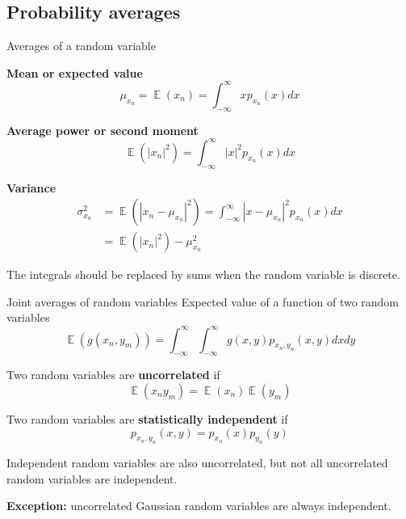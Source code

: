 \documentclass[10pt]{beamer}
\DeclareMathOperator{\E}{\mathbb{E}} %
\begin{document}
\subsection{Probability averages}
\begin{frame}{Averages of a random variable}

\textbf{Mean or expected value}
\begin{equation*}
	\mu_{x_n} = \E(x_n) = \int_{-\infty}^{\infty}xp_{x_n}(x)dx
\end{equation*}

\pause
\textbf{Average power or second moment}
\begin{equation*} 
	\E(|x_n|^2) = \int_{-\infty}^{\infty}|x|^2p_{x_n}(x)dx
\end{equation*}

\pause
\textbf{Variance}
\begin{align*}
\sigma^2_{x_n} &= \E(|x_n-\mu_{x_n}|^2) = \int_{-\infty}^{\infty}|x-\mu_{x_n}|^2p_{x_n}(x)dx \\
&= \E(|x_n|^2) - \mu_{x_n}^2
\end{align*}

The integrals should be replaced by sums when the random variable is discrete.

\end{frame}

\begin{frame}{Joint averages of random variables}
Expected value of a function of two random variables
\begin{equation*}
\E(g(x_n,y_m)) = \int_{-\infty}^{\infty}\int_{-\infty}^{\infty}g(x, y)p_{x_n, y_n}(x, y)dxdy
\end{equation*}

\pause
Two random variables are \textbf{uncorrelated} if
\begin{equation*}
\E(x_ny_m) = \E(x_n)\E(y_m)
\end{equation*}

\pause
Two random variables are \textbf{statistically independent} if
\begin{equation*}
p_{x_n, y_n}(x,y) = p_{x_n}(x)p_{y_n}(y)
\end{equation*}

Independent random variables are also uncorrelated, but not all uncorrelated random variables are independent.

\textbf{Exception:} uncorrelated Gaussian random variables are always independent.
\end{frame}
\end{document}
